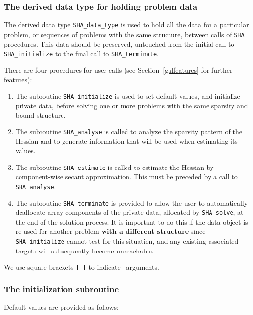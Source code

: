 \documentclass{galahad}
\newcommand{\packagename}{SHA}
\begin{document}

\subsubsection{The derived data type for holding problem data}\label{typedata}
The derived data type
{\tt \packagename\_data\_type}
is used to hold all the data for a particular problem,
or sequences of problems with the same structure, between calls of
{\tt \packagename} procedures.
This data should be preserved, untouched from the initial call to
{\tt \packagename\_initialize}
to the final call to
{\tt \packagename\_terminate}.


\galarguments
There are four procedures for user calls
(see Section~\ref{galfeatures} for further features):

\begin{enumerate}
\item The subroutine
      {\tt \packagename\_initialize}
      is used to set default values, and initialize private data,
      before solving one or more problems with the
      same sparsity and bound structure.
\item The subroutine
      {\tt \packagename\_analyse}
      is called to analyze the sparsity pattern of the Hessian
      and to generate information that will be used when estimating
      its values.
\item The subroutine
      {\tt \packagename\_estimate}
      is called to estimate the Hessian by component-wise secant
      approximation. This must be preceded by a call to
      {\tt \packagename\_analyse}.
\item The subroutine
      {\tt \packagename\_terminate}
      is provided to allow the user to automatically deallocate array
       components of the private data, allocated by
       {\tt \packagename\_solve},
       at the end of the solution process.
       It is important to do this if the data object is re-used for another
       problem {\bf with a different structure}
       since {\tt \packagename\_initialize} cannot test for this situation,
       and any existing associated targets will subsequently become unreachable.
\end{enumerate}
We use square brackets {\tt [ ]} to indicate \optional\ arguments.


\subsubsection{The initialization subroutine}\label{subinit}
 Default values are provided as follows:
\vspace*{1mm}
\end{document}
